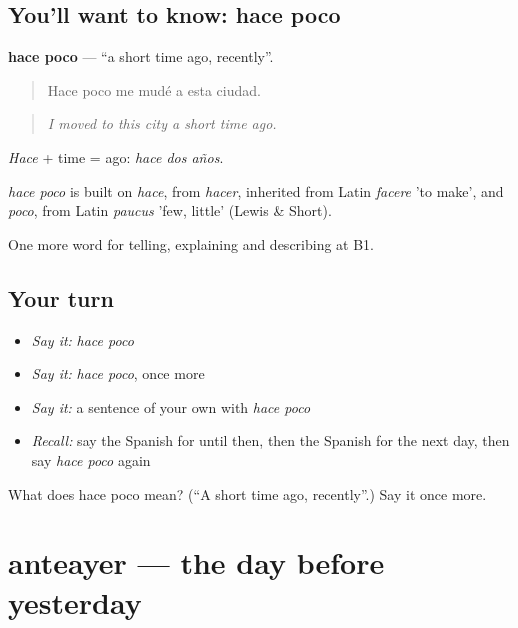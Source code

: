 \subsection*{You'll want to know: hace poco}
\textbf{hace poco} — \textquotedblleft{}a short time ago, recently\textquotedblright{}.

\begin{quote}
Hace poco me mudé a esta ciudad.
\end{quote}

\begin{quote}
\emph{I moved to this city a short time ago.}
\end{quote}

\emph{Hace} + time = ago: \emph{hace dos años}.

\begin{cousinweb}
\emph{hace poco} is built on \emph{hace}, from \emph{hacer}, inherited from Latin \emph{facere} 'to make', and \emph{poco}, from Latin \emph{paucus} 'few, little' (Lewis \& Short).
\end{cousinweb}

\begin{grammarlens}[title={What you've built}]
One more word for telling, explaining and describing at B1.
\end{grammarlens}

\subsection*{Your turn}
\begin{itemize}
\raggedright
  \item \emph{Say it:} \emph{hace poco}
  \item \emph{Say it:} \emph{hace poco}, once more
  \item \emph{Say it:} a sentence of your own with \emph{hace poco}
  \item \emph{Recall:} say the Spanish for until then, then the Spanish for the next day, then say \emph{hace poco} again
\end{itemize}

\begin{tcolorbox}[breakable,colback=teal!4,colframe=teal!35!black,title={Before you move on}]
What does hace poco mean? (\textquotedblleft{}A short time ago, recently\textquotedblright{}.) Say it once more.
\end{tcolorbox}
\section[anteayer]{anteayer — the day before yesterday}

